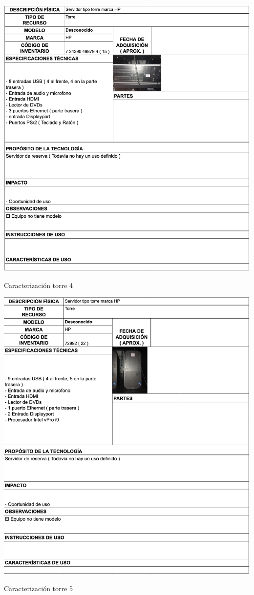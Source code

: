 \begin{table}[H]
    \centering
    \includegraphics[width=\textwidth]{tablas-images/cp1/torres/torre-4.png}
    \caption{Caracterización torre 4}\label{tab:torre-4}
\end{table}

\begin{table}[H]
    \centering
    \includegraphics[width=\textwidth]{tablas-images/cp1/torres/torre-5.png}
    \caption{Caracterización torre 5}\label{tab:torre-5}
\end{table}


